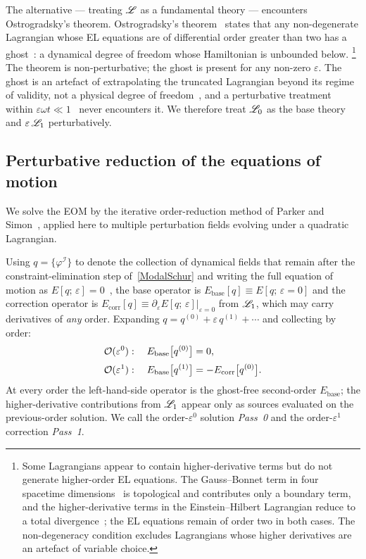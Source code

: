 The alternative --- treating $\mathscr{L}$ as a fundamental theory ---
encounters Ostrogradsky's theorem.
Ostrogradsky's theorem~\cite{ostrogradsky1850memoires,Pais:1950za} states
that any non-degenerate Lagrangian whose EL equations are of differential
order greater than two has a ghost~\cite{Woodard:2015zca}: a dynamical degree of
freedom whose Hamiltonian is unbounded below.%
\footnote{Some Lagrangians appear to contain higher-derivative terms but do not
generate higher-order EL equations. The Gauss--Bonnet term in four spacetime
dimensions~\cite{Lovelock:1971yv} is topological and contributes only a boundary
term, and the higher-derivative terms in the Einstein--Hilbert
Lagrangian reduce to a total
divergence~\cite{hobson2006general}; the EL equations remain of order two in both
cases. The non-degeneracy condition excludes Lagrangians whose
higher derivatives are an artefact of variable choice.}
The theorem is non-perturbative; the ghost is present for any non-zero $\varepsilon$.
The ghost is an artefact of extrapolating the truncated Lagrangian beyond its regime of
validity, not a physical degree of freedom~\cite{Simon:1990jn,Donoghue:1994dn}, and a perturbative treatment within
$\varepsilon \omega t \ll 1$~\cite{parker1993reduced} never
encounters it.
We therefore treat $\mathscr{L}_0$ as the base theory and $\varepsilon\,\mathscr{L}_1$
perturbatively.

\subsection{Perturbative reduction of the equations of motion}
We solve the EOM by the iterative order-reduction method of Parker
and Simon~\cite{parker1993reduced}, applied here to multiple perturbation
fields evolving under a quadratic Lagrangian.

Using $q = \{\varphi^{\mathcal{I}}\}$ to denote the collection of dynamical fields
that remain after the constraint-elimination step of~\cref{ModalSchur} and writing
the full equation of motion as $E[q;\,\varepsilon] = 0$~\cite{parker1993reduced,
jaen1986reduction},
the base operator is $E_{\mathrm{base}}[q] \equiv E[q;\,\varepsilon{=}0]$ and the correction operator
is $E_{\mathrm{corr}}[q] \equiv \partial_\varepsilon E[q;\,\varepsilon]\big|_{\varepsilon=0}$
from $\mathscr{L}_1$, which may carry derivatives of \emph{any} order.
Expanding $q = q^{(0)} + \varepsilon\,q^{(1)} + \cdots$ and collecting by order:
\begin{align}
  \mathcal{O}(\varepsilon^0) &:\quad
    E_{\mathrm{base}}\bigl[q^{(0)}\bigr] = 0, \notag \\[2pt]
  \mathcal{O}(\varepsilon^1) &:\quad
    E_{\mathrm{base}}\bigl[q^{(1)}\bigr] = -E_{\mathrm{corr}}\bigl[q^{(0)}\bigr].
  \label{EOMHierarchy}
\end{align}
At every order the left-hand-side operator is the ghost-free second-order
$E_{\mathrm{base}}$; the higher-derivative contributions from $\mathscr{L}_1$ appear
only as sources evaluated on the previous-order solution.
We call the order-$\varepsilon^0$ solution \emph{Pass~0} and the
order-$\varepsilon^1$ correction \emph{Pass~1}.

